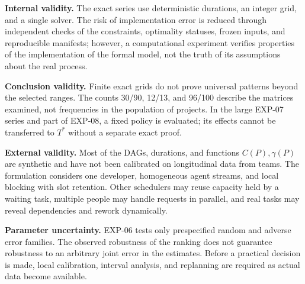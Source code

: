 \textbf{Internal validity.}
The exact series use deterministic durations, an integer grid, and a single
solver. The risk of implementation error is reduced through independent checks
of the constraints, optimality statuses, frozen inputs, and reproducible
manifests; however, a computational experiment verifies properties of the
implementation of the formal model, not the truth of its assumptions about the
real process.

\textbf{Conclusion validity.}
Finite exact grids do not prove universal patterns beyond the selected ranges.
The counts 30/90, 12/13, and 96/100 describe the matrices examined, not
frequencies in the population of projects. In the large EXP-07 series and part
of EXP-08, a fixed policy is evaluated; its effects cannot be transferred to
$T^*$ without a separate exact proof.

\textbf{External validity.}
Most of the DAGs, durations, and functions $C(P),\gamma(P)$ are synthetic and
have not been calibrated on longitudinal data from teams. The formulation
considers one developer, homogeneous agent streams, and local blocking with
slot retention. Other schedulers may reuse capacity held by a waiting task,
multiple people may handle requests in parallel, and real tasks may reveal
dependencies and rework dynamically.

\textbf{Parameter uncertainty.}
EXP-06 tests only prespecified random and adverse error families. The observed
robustness of the ranking does not guarantee robustness to an arbitrary joint
error in the estimates. Before a practical decision is made, local calibration,
interval analysis, and replanning are required as actual data become available.
